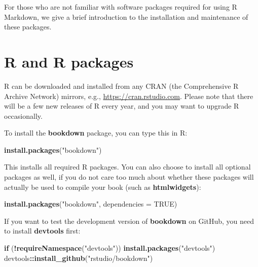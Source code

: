 \documentclass[
  12pt,
]{book}
\newenvironment{Shaded}{\begin{snugshade}}{\end{snugshade}}
\newcommand{\ControlFlowTok}[1]{\textcolor[rgb]{0.13,0.29,0.53}{\textbf{#1}}}
\newcommand{\DataTypeTok}[1]{\textcolor[rgb]{0.13,0.29,0.53}{#1}}
\newcommand{\KeywordTok}[1]{\textcolor[rgb]{0.13,0.29,0.53}{\textbf{#1}}}
\newcommand{\NormalTok}[1]{#1}
\newcommand{\OperatorTok}[1]{\textcolor[rgb]{0.81,0.36,0.00}{\textbf{#1}}}
\newcommand{\OtherTok}[1]{\textcolor[rgb]{0.56,0.35,0.01}{#1}}
\newcommand{\StringTok}[1]{\textcolor[rgb]{0.31,0.60,0.02}{#1}}
\begin{document}
For those who are not familiar with software packages required for using R Markdown, we give a brief introduction to the installation and maintenance of these packages.

\hypertarget{r-and-r-packages}{%
\section{R and R packages}\label{r-and-r-packages}}

R can be downloaded and installed from any CRAN (the Comprehensive R Archive Network) mirrors, e.g., \url{https://cran.rstudio.com}. Please note that there will be a few new releases of R every year, and you may want to upgrade R occasionally.

To install the \textbf{bookdown} package, you can type this in R:

\begin{Shaded}
\begin{Highlighting}[]
\KeywordTok{install.packages}\NormalTok{(}\StringTok{"bookdown"}\NormalTok{)}
\end{Highlighting}
\end{Shaded}

This installs all required R packages. You can also choose to install all optional packages as well, if you do not care too much about whether these packages will actually be used to compile your book (such as \textbf{htmlwidgets}):

\begin{Shaded}
\begin{Highlighting}[]
\KeywordTok{install.packages}\NormalTok{(}\StringTok{"bookdown"}\NormalTok{, }\DataTypeTok{dependencies =} \OtherTok{TRUE}\NormalTok{)}
\end{Highlighting}
\end{Shaded}

If you want to test the development version of \textbf{bookdown} on GitHub, you need to install \textbf{devtools} first:

\begin{Shaded}
\begin{Highlighting}[]
\ControlFlowTok{if}\NormalTok{ (}\OperatorTok{!}\KeywordTok{requireNamespace}\NormalTok{(}\StringTok{"devtools"}\NormalTok{)) }\KeywordTok{install.packages}\NormalTok{(}\StringTok{"devtools"}\NormalTok{)}
\NormalTok{devtools}\OperatorTok{::}\KeywordTok{install\_github}\NormalTok{(}\StringTok{"rstudio/bookdown"}\NormalTok{)}
\end{Highlighting}
\end{Shaded}
\end{document}
